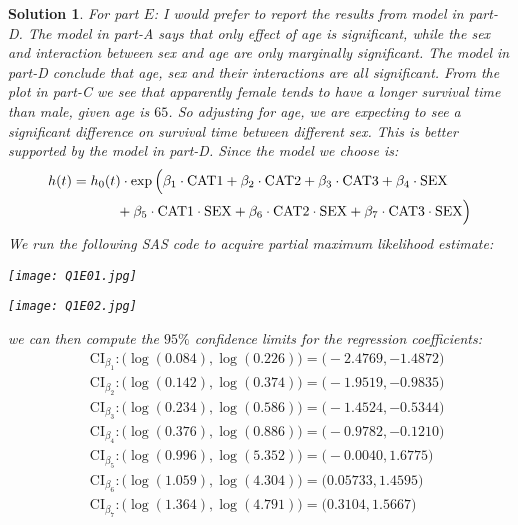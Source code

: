 \documentclass[11pt]{article}
\newtheorem{sol}{Solution}
\begin{document}
\begin{sol}
	For part $E$:\vskip 2mm
	I would prefer to report the results from model in part-D. The model in part-A says that only effect of age is significant, while the sex and interaction between sex and age are only marginally significant.  The model in part-D conclude that age, sex and their interactions are all significant. From the plot in part-C we see that apparently female tends to have a longer survival time than male, given age is $65$. So adjusting for age, we are expecting to see a significant difference on survival time between different sex. This is better supported by the model in part-D.\vskip 2mm
	Since the model we choose is:
	\begin{align*}
		h(t) &= h_0(t)\cdot \exp\Big(\beta_1\cdot \text{CAT}1 + \beta_2\cdot \text{CAT}2 + \beta_3\cdot \text{CAT}3 + \beta_4\cdot \text{SEX} \\
		&\ \hskip 1cm + \beta_5 \cdot \text{CAT}1\cdot \text{SEX} + \beta_6 \cdot \text{CAT}2\cdot \text{SEX} + \beta_7\cdot \text{CAT}3\cdot \text{SEX}\Big)
	\end{align*}
	We run the following SAS code to acquire partial maximum likelihood estimate:
	\begin{center}
		\texttt{[image: Q1E01.jpg]}
	\end{center}
	\begin{center}
		\texttt{[image: Q1E02.jpg]}
	\end{center}
	we can then compute the $95\%$ confidence limits for the regression coefficients:
	\begin{align*}
		&\ \text{CI}_{\beta_1}:  \Big(\log (0.084), \log (0.226)\Big) = \Big(-2.4769, -1.4872\Big)\\
		&\ \text{CI}_{\beta_2}:  \Big(\log (0.142), \log (0.374)\Big) = \Big(-1.9519,-0.9835 \Big)\\
		&\ \text{CI}_{\beta_3}:  \Big(\log (0.234), \log (0.586)\Big) = \Big(-1.4524, -0.5344\Big)\\
		&\ \text{CI}_{\beta_4}:  \Big(\log (0.376), \log (0.886)\Big) = \Big(-0.9782, -0.1210\Big)\\
		&\ \text{CI}_{\beta_5}:  \Big(\log (0.996), \log (5.352)\Big) = \Big(-0.0040, 1.6775\Big)\\
		&\ \text{CI}_{\beta_6}:  \Big(\log (1.059), \log (4.304)\Big) = \Big(0.05733, 1.4595\Big)\\
		&\ \text{CI}_{\beta_7}:  \Big(\log (1.364), \log (4.791)\Big) = \Big(0.3104, 1.5667\Big)

\end{align*}
\end{sol}
\end{document}
